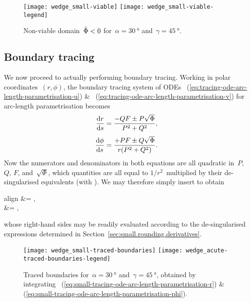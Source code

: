 \begin{figure}
  \newcommand*{\legendoffsetheight}{0.255\textwidth}
  \centering
  \texttt{[image: wedge\_small-viable]}
  \texttt{[image: wedge\_small-viable-legend]}
  \caption{
    Non-viable domain~$\tilde{\Phi} < 0$
    for~$\alpha = \SI{30}{\degree}$ and~$\gamma = \SI{45}{\degree}$.
  }
  \label{fig:wedge_small-viable}
\end{figure}

\subsection{Boundary tracing}
\label{sec:small.rounding.tracing}

We now proceed to actually performing boundary tracing.
Working in polar coordinates~$(r, \phi)$,
the boundary tracing system of ODEs~%
  (\ref{eq:tracing-ode-arc-length-parametrisation-u})
\&~%
  (\ref{eq:tracing-ode-arc-length-parametrisation-v})
for arc-length parametrisation
becomes
\begin{align*}
  \tder{r}{s} &= \frac{-Q F \pm P \sqrt{\Phi}}{P^2 + Q^2},
    \\[\tallspace]
  \tder{\phi}{s} &= \frac{+P F \pm Q \sqrt{\Phi}}{r \roundbr*{P^2 + Q^2}}.
\end{align*}
Now the numerators and denominators in both equations
are all quadratic in~$P$, $Q$, $F$, and~$\sqrt{\Phi}$,
which quantities are all equal to $1 / r^2$~multiplied by
their de-singularised equivalents (with \desingmarks).
We may therefore simply insert \desingmarks{} to obtain
\begin{important}{align}
   &=
    ,
    \label{eq:small-tracing-ode-arc-length-parametrisation-r}
    \\[\tallspace]
   &=
    ,
    \label{eq:small-tracing-ode-arc-length-parametrisation-phi}
\end{important}
whose right-hand sides may be readily evaluated
according to the de-singularised expressions determined in
Section~\ref{sec:small.rounding.derivatives}.

\begin{figure}
  \newcommand*{\legendoffsetheight}{0.25\textwidth}
  \centering
  \texttt{[image: wedge\_small-traced-boundaries]}
  \texttt{[image: wedge\_acute-traced-boundaries-legend]}
  \caption{
    Traced boundaries for~$\alpha = \SI{30}{\degree}$
    and~$\gamma = \SI{45}{\degree}$,
    obtained by integrating~%
      (\ref{eq:small-tracing-ode-arc-length-parametrisation-r})
    \&~%
      (\ref{eq:small-tracing-ode-arc-length-parametrisation-phi}).
  }
  \label{fig:wedge_small-traced-boundaries}
\end{figure}


